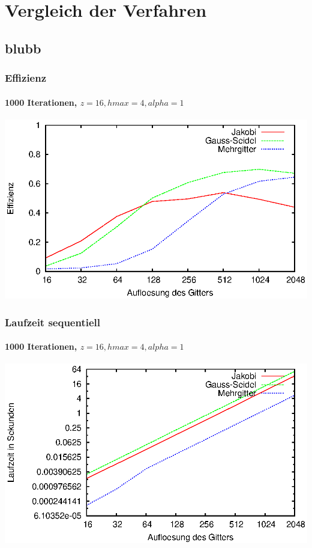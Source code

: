 \documentclass{beamer}
\begin{document}
\section{Vergleich der Verfahren}
\subsection*{blubb}

\begin{frame}
    \frametitle{Effizienz}
    \framesubtitle{1000 Iterationen, $z=16, hmax=4, alpha=1$}
    \includegraphics[width=\textwidth]{plots/effizienz}
\end{frame}

\begin{frame}
    \frametitle{Laufzeit sequentiell}
    \framesubtitle{1000 Iterationen, $z=16, hmax=4, alpha=1$}
    \includegraphics[width=\textwidth]{plots/laufzeitensequenziell}
\end{frame}
\end{document}
